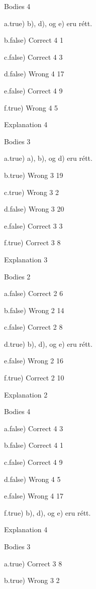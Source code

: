 
Bodies 4

a.true) b), d), og e) eru rétt.

b.false) Correct 4 1

c.false) Correct 4 3

d.false) Wrong 4 17

e.false) Correct 4 9

f.true) Wrong 4 5

Explanation 4


Bodies 3

a.true) a), b), og d) eru rétt.

b.true) Wrong 3 19

c.true) Wrong 3 2

d.false) Wrong 3 20

e.false) Correct 3 3

f.true) Correct 3 8

Explanation 3


Bodies 2

a.false) Correct 2 6

b.false) Wrong 2 14

c.false) Correct 2 8

d.true) b), d), og e) eru rétt.

e.false) Wrong 2 16

f.true) Correct 2 10

Explanation 2


Bodies 4

a.false) Correct 4 3

b.false) Correct 4 1

c.false) Correct 4 9

d.false) Wrong 4 5

e.false) Wrong 4 17

f.true) b), d), og e) eru rétt.

Explanation 4


Bodies 3

a.true) Correct 3 8

b.true) Wrong 3 2

